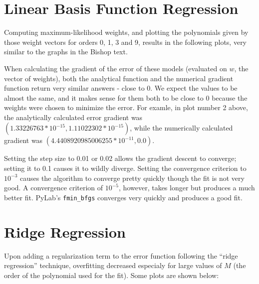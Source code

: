 \documentclass{paper}
\begin{document}
\section{Linear Basis Function Regression}

Computing maximum-likelihood weights, and plotting the polynomials given by those weight vectors for orders 0, 1, 3 and 9, results in the following plots, very similar to the graphs in the Bishop text.

\begin{figure}[H]
	
\end{figure}


When calculating the gradient of the error of these models (evaluated on $w$, the vector of weights), both the analytical function and the numerical gradient function return very similar answers - close to 0. We expect the values to be almost the same, and it makes sense for them both to be close to 0 because the weights were chosen to minimize the error. For examle, in plot number 2 above, the analytically calculated error gradient was $(1.33226763 * 10^{-15}, 1.11022302 * 10^{-15})$, while the numerically calculated gradient was $(4.4408920985006255 * 10^{-11}, 0.0)$.

Setting the step size to 0.01 or 0.02 allows the gradient descent to converge; setting it to 0.1 causes it to wildly diverge. Setting the convergence criterion to $10^{-3}$ causes the algorithm to converge pretty quickly though the fit is not very good. A convergence criterion of $10^{-5}$, however, takes longer but produces a much better fit. PyLab's \texttt{fmin\_bfgs} converges very quickly and produces a good fit.

\section{Ridge Regression}

Upon adding a regularization term to the error function following the ``ridge regression'' technique, overfitting decreased especialy for large values of $M$ (the order of the polynomial used for the fit). Some plots are shown below:
\end{document}
